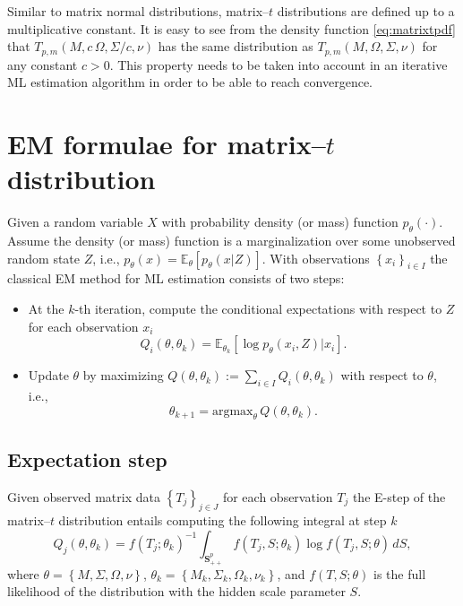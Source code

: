 \documentclass[english,listof=totoc]{scrartcl}
\begin{document}
Similar to matrix normal distributions, matrix--$t$ distributions are
defined up to a multiplicative constant. It is easy to see from the
density function \eqref{eq:matrixtpdf} that
$T_{p,m}(M,c\,\Omega,\Sigma/c,\nu)$ has the same distribution as
$T_{p,m}(M,\Omega,\Sigma,\nu)$ for any constant $c>0$. This property
needs to be taken into account in an iterative ML estimation algorithm
in order to be able to reach convergence.


\section{EM formulae for matrix--$t$ distribution}\label{sec:EM}

Given a random variable $X$ with probability density (or mass) function $p_{\theta}(\cdot)$. Assume the density (or mass) function is a marginalization over some unobserved random state $Z$, i.e., $p_{\theta}(x)=\mathbb{E}_{\theta}\left[p_{\theta}(x|Z)\right]$. With observations $\left\{x_i\right\}_{i\in I}$ the classical EM method for ML estimation consists of two steps:

\begin{itemize}
\item At the $k$-th iteration, compute the conditional expectations with respect to $Z$ for each observation $x_i$
\begin{equation}
Q_i(\theta,\theta_k)=\mathbb{E}_{\theta_k}\left[\log p_{\theta}(x_i,Z)|x_i\right].
\end{equation}

\item Update $\theta$ by maximizing $Q(\theta,\theta_k):=\sum_{i\in I}Q_i(\theta,\theta_k)$ with respect to $\theta$, i.e.,
\begin{equation}
\theta_{k+1} = \textrm{argmax}_{\theta}\,Q(\theta,\theta_k).
\end{equation}
\end{itemize}

\subsection{Expectation step}

Given observed matrix data $\left\{T_j\right\}_{j\in J}$ for each observation $T_j$ the E-step of the matrix--$t$ distribution entails computing the following integral at step $k$
\begin{equation}
Q_j(\theta,\theta_k)=f(T_j;\theta_k)^{-1}\int_{\mathbf{S}_{++}^p}f(T_{j},S;\theta_k)\log f\left(T_{j},S;\theta\right)\,dS,\label{eq:expdef}
\end{equation}
where $\theta=\left\{M,\Sigma,\Omega,\nu\right\}$, $\theta_k=\left\{M_k,\Sigma_k,\Omega_k,\nu_k\right\}$, and $f(T,S;\theta)$ is the full likelihood of the distribution with the hidden scale parameter $S$.
\end{document}
